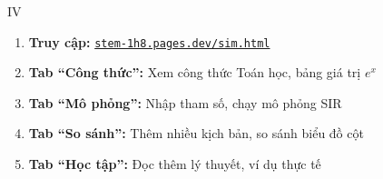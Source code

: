 \documentclass[12pt,a4paper]{article}
\begin{document}
\begin{competitionsection}{IV}
\begin{enumerate}
\item \textbf{Truy cập:} \href{https://stem-1h8.pages.dev/sim.html}{\texttt{stem-1h8.pages.dev/sim.html}}
\item \textbf{Tab ``Công thức'':} Xem công thức Toán học, bảng giá trị $e^x$
\item \textbf{Tab ``Mô phỏng'':} Nhập tham số, chạy mô phỏng SIR
\item \textbf{Tab ``So sánh'':} Thêm nhiều kịch bản, so sánh biểu đồ cột
\item \textbf{Tab ``Học tập'':} Đọc thêm lý thuyết, ví dụ thực tế
\end{enumerate}

\end{competitionsection}
\newpage

\end{document}
